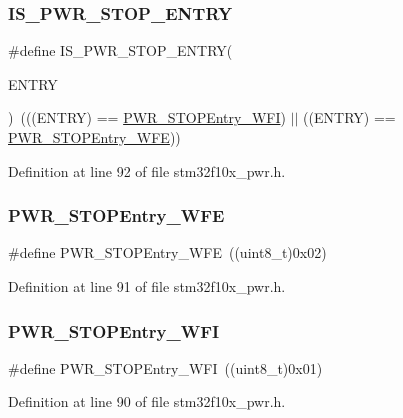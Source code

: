 \subsubsection{\texorpdfstring{I\+S\+\_\+\+P\+W\+R\+\_\+\+S\+T\+O\+P\+\_\+\+E\+N\+T\+RY}{IS\_PWR\_STOP\_ENTRY}}
{\footnotesize\ttfamily \#define I\+S\+\_\+\+P\+W\+R\+\_\+\+S\+T\+O\+P\+\_\+\+E\+N\+T\+RY(\begin{DoxyParamCaption}\item[{}]{E\+N\+T\+RY }\end{DoxyParamCaption})~(((E\+N\+T\+RY) == \hyperlink{group___s_t_o_p__mode__entry_gaa1e1362f3d0b93e8f5f674e18cfc96c4}{P\+W\+R\+\_\+\+S\+T\+O\+P\+Entry\+\_\+\+W\+FI}) $\vert$$\vert$ ((E\+N\+T\+RY) == \hyperlink{group___s_t_o_p__mode__entry_gaac98ac55fb8764121d4168d99c9b369e}{P\+W\+R\+\_\+\+S\+T\+O\+P\+Entry\+\_\+\+W\+FE}))}



Definition at line 92 of file stm32f10x\+\_\+pwr.\+h.

\mbox{\label{group___s_t_o_p__mode__entry_gaac98ac55fb8764121d4168d99c9b369e}} 
\subsubsection{\texorpdfstring{P\+W\+R\+\_\+\+S\+T\+O\+P\+Entry\+\_\+\+W\+FE}{PWR\_STOPEntry\_WFE}}
{\footnotesize\ttfamily \#define P\+W\+R\+\_\+\+S\+T\+O\+P\+Entry\+\_\+\+W\+FE~((uint8\+\_\+t)0x02)}



Definition at line 91 of file stm32f10x\+\_\+pwr.\+h.

\mbox{\label{group___s_t_o_p__mode__entry_gaa1e1362f3d0b93e8f5f674e18cfc96c4}} 
\subsubsection{\texorpdfstring{P\+W\+R\+\_\+\+S\+T\+O\+P\+Entry\+\_\+\+W\+FI}{PWR\_STOPEntry\_WFI}}
{\footnotesize\ttfamily \#define P\+W\+R\+\_\+\+S\+T\+O\+P\+Entry\+\_\+\+W\+FI~((uint8\+\_\+t)0x01)}



Definition at line 90 of file stm32f10x\+\_\+pwr.\+h.

